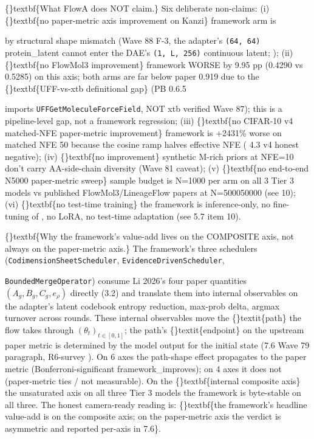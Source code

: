 \documentclass{article}
\begin{document}
\{\}textbf\{What FlowA does NOT claim.\} Six deliberate non-claims: (i) \{\}textbf\{no paper-metric axis improvement on Kanzi\}  framework arm is

 by structural shape mismatch (Wave 88 F-3, the adapter's \texttt{(64, 64)} protein\_latent cannot enter the DAE's \texttt{(1, L, 256)} continuous latent; ); (ii) \{\}textbf\{no FlowMol3  improvement\}  framework WORSE by 9.95 pp (0.4290 vs 0.5285) on this axis; both arms are far below paper 0.919 due to the \{\}textbf\{UFF-vs-xtb definitional gap\} (PB 0.6.5

 imports \texttt{UFFGetMoleculeForceField}, NOT xtb  verified Wave 87); this is a pipeline-level gap, not a framework regression; (iii) \{\}textbf\{no CIFAR-10 v4 matched-NFE paper-metric improvement\}  framework is +2431\% worse on matched NFE 50 because the cosine ramp halves effective NFE ( 4.3 v4 honest negative); (iv) \{\}textbf\{no  improvement\}  synthetic M-rich priors at NFE=10 don't carry AA-side-chain diversity (Wave 81 caveat); (v) \{\}textbf\{no end-to-end N5000 paper-metric sweep\}  sample budget is N=1000 per arm on all 3 Tier 3 models vs published FlowMol3/LineageFlow papers at N=500050000 (see 10); (vi) \{\}textbf\{no test-time training\}  the framework is inference-only, no fine-tuning of , no LoRA, no test-time adaptation (see 5.7 item 10).

\{\}textbf\{Why the framework's value-add lives on the COMPOSITE axis, not always on the paper-metric axis.\} The framework's three schedulers (\texttt{CodimensionSheetScheduler}, \texttt{EvidenceDrivenScheduler},

\texttt{BoundedMergeOperator}) consume Li 2026's four paper quantities $(A_g, B_g, C_g, e_\rho)$ directly (3.2) and translate them into internal observables on the adapter's latent codebook  entropy reduction, max-prob delta, argmax turnover across rounds. These internal observables move the \{\}textit\{path\} the flow takes through $(\theta_t)_{t \in [0,1]}$; the path's \{\}textit\{endpoint\} on the upstream paper metric is determined by the model output for the initial state (7.6 Wave 79 paragraph, R6-survey ). On 6 axes the path-shape effect propagates to the paper metric (Bonferroni-significant framework\_improves); on 4 axes it does not (paper-metric ties / not measurable). On the \{\}textbf\{internal composite axis\}  the unsaturated axis on all three Tier 3 models  the framework is byte-stable  on all three. The honest camera-ready reading is: \{\}textbf\{the framework's headline value-add is on the composite axis; on the paper-metric axis the verdict is asymmetric and reported per-axis in 7.6\}.
\end{document}
